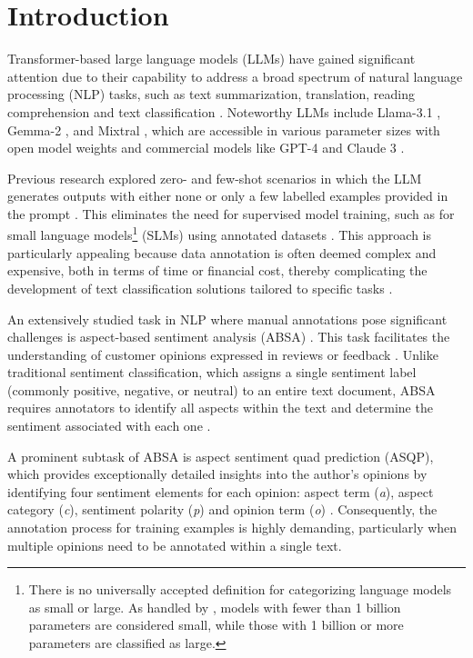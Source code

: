 \section{Introduction}

Transformer-based large language models (LLMs) have gained significant attention due to their capability to address a broad spectrum of natural language processing (NLP) tasks, such as text summarization, translation, reading comprehension and text classification \citep{brown2020language,dubey2024llama}. Noteworthy LLMs include Llama-3.1 \citep{dubey2024llama}, Gemma-2 \citep{team2024gemma}, and Mixtral \citep{jiang2024mixtral}, which are accessible in various parameter sizes with open model weights and commercial models like GPT-4 \citep{achiam2023gpt} and Claude 3 \citep{anthropic2024claude}.

Previous research explored zero- and few-shot scenarios in which the LLM generates outputs with either none or only a few labelled examples provided in the prompt \cite{gou2023mvp, zhang2024sentiment}. This eliminates the need for supervised model training, such as for small language models\footnote{There is no universally accepted definition for categorizing language models as small or large. As handled by \citet{zhang2024sentiment}, models with fewer than 1 billion parameters are considered small, while those with 1 billion or more parameters are classified as large.} (SLMs) using annotated datasets \citep{wang2023large}. This approach is particularly appealing because data annotation is often deemed complex and expensive, both in terms of time or financial cost, thereby complicating the development of text classification solutions tailored to specific tasks \citep{fehle2023absa,gretz2023zero,li2023data}.

An extensively studied task in NLP where manual annotations pose significant challenges is aspect-based sentiment analysis (ABSA) \citep{zhang2022survey}. This task facilitates the understanding of customer opinions expressed in reviews or feedback \citep{pontiki2014semeval}. Unlike traditional sentiment classification, which assigns a single sentiment label (commonly positive, negative, or neutral) to an entire text document, ABSA requires annotators to identify all aspects within the text and determine the sentiment associated with each one \citep{zhang2022survey}.

A prominent subtask of ABSA is aspect sentiment quad prediction (ASQP), which provides exceptionally detailed insights into the author's opinions by identifying four sentiment elements for each opinion: aspect term (\textit{a}), aspect category (\textit{c}), sentiment polarity (\textit{p}) and opinion term (\textit{o}) \citep{zhang2021aspect}. Consequently, the annotation process for training examples is highly demanding, particularly when multiple opinions need to be annotated within a single text.

